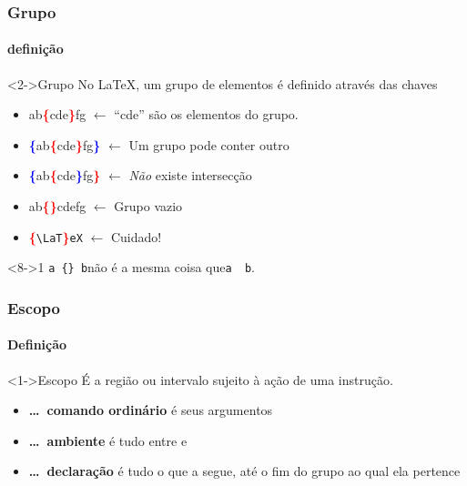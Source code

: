 \documentclass[handout,10pt]{beamer}
\begin{document}
\begin{frame}[fragile]
	\frametitle{Grupo}
	\framesubtitle{definição}
	
	\begin{block}<2->{Grupo}
		No \LaTeX, um grupo de elementos é definido através das chaves
	\end{block}\vfill
		
	\begin{itemize}
	\item<3-> {\large ab\textcolor{red}{\bfseries\Large\{}cde\textcolor{red}{\bfseries\Large\}}fg}
						\hfill \(\leftarrow\) ``cde'' são os elementos do grupo.
	\item<4-> {\large\textcolor{blue}{\bfseries\Large\{}ab\textcolor{red}{\bfseries\Large\{}cde\textcolor{red}{\bfseries\Large\}}fg\textcolor{blue}{\bfseries\Large\}}}
						\hfill \(\leftarrow\) Um grupo pode conter outro
	\item<5-> {\large\textcolor{blue}{\bfseries\Large\{}ab\textcolor{red}{\bfseries\Large\{}cde\textcolor{blue}{\bfseries\Large\}}fg\textcolor{red}{\bfseries\Large\}}}
						\hfill \(\leftarrow\) \alert<5>{\emph{Não} existe intersecção}
	\item<6-> {\large ab\textcolor{red}{\bfseries\Large\{}\textcolor{red}{\bfseries\Large\}}cdefg}
						\hfill \(\leftarrow\) Grupo vazio
	\item<7-> {\large\textcolor{red}{\bfseries\Large\{}\verb|\LaT|\textcolor{red}{\bfseries\Large\}}\verb|eX|}
						\hfill \(\leftarrow\) Cuidado!
	\end{itemize}
			
	\begin{atividade}<8->{1}
		\verb|a {} b|\quad não é a mesma coisa que\quad \verb|a  b|.
	\end{atividade}
			
\end{frame}
\begin{frame}
	\frametitle{Escopo}
	\framesubtitle{Definição}
	
	\begin{block}<1->{Escopo}
		É a região ou intervalo sujeito à ação de uma instrução.
	\end{block}\vfill
	
	\begin{itemize}
	\item<2-> \textbf{\dots\ comando ordinário} é seus argumentos
	\item<3-> \textbf{\dots\ ambiente} é tudo entre  e 
	\item<4-> \textbf{\dots\ declaração} é tudo o que a segue, até o fim do grupo ao qual ela pertence
	\end{itemize}
\end{frame}
\end{document}
